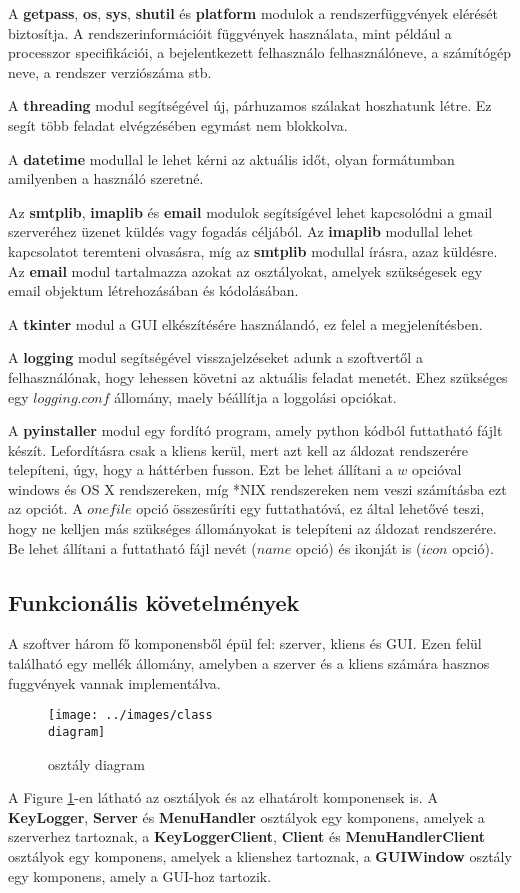 \documentclass[a4paper, 11pt]{article}
\begin{document}
A \textbf{getpass}, \textbf{os}, \textbf{sys}, \textbf{shutil} és \textbf{platform} modulok a rendszerfüggvények elérését biztosítja. A rendszerinformációit függvények használata, mint például a processzor specifikációi, a bejelentkezett felhasználo felhasználóneve, a számítógép neve, a rendszer verziószáma stb.

A \textbf{threading} modul segítségével új, párhuzamos szálakat hoszhatunk létre. Ez segít több feladat elvégzésében egymást nem blokkolva.

A \textbf{datetime} modullal le lehet kérni az aktuális időt, olyan formátumban amilyenben a használó szeretné. %

Az \textbf{smtplib}, \textbf{imaplib} és \textbf{email} modulok segítsígével lehet kapcsolódni a gmail szerveréhez üzenet küldés vagy fogadás céljából. Az \textbf{imaplib} modullal lehet kapcsolatot teremteni olvasásra, míg az \textbf{smtplib} modullal írásra, azaz küldésre. Az \textbf{email} modul tartalmazza azokat az osztályokat, amelyek szükségesek egy email objektum létrehozásában és kódolásában.

A \textbf{tkinter} modul a GUI elkészítésére használandó, ez felel a megjelenítésben.

A \textbf{logging} modul segítségével visszajelzéseket adunk a szoftvertől a felhasználónak, hogy lehessen követni az aktuális feladat menetét. Ehez szükséges egy $logging.conf$ állomány, maely béállítja a loggolási opciókat.

A \textbf{pyinstaller} modul egy fordító program, amely python kódból futtatható fájlt készít. Lefordításra csak a kliens kerül, mert azt kell az áldozat rendszerére telepíteni, úgy, hogy a háttérben fusson. Ezt be lehet állítani a $w$ opcióval windows és OS X rendszereken, míg *NIX rendszereken nem veszi számításba ezt az opciót. A $onefile$ opció összesűríti egy futtathatóvá, ez által lehetővé teszi, hogy ne kelljen más szükséges állományokat is telepíteni az áldozat rendszerére. Be lehet állítani a futtatható fájl nevét ($name$ opció) és ikonját is ($icon$ opció).



\subsection{Funkcionális követelmények}
A szoftver három fő komponensből épül fel: szerver, kliens és GUI. Ezen felül található egy mellék állomány, amelyben a szerver és a kliens számára hasznos fuggvények vannak implementálva.
\begin{figure}[H]
\centering
\texttt{[image: ../images/class\\ diagram]}
\caption{osztály diagram}
\label{fig:classdia}
\end{figure}
A Figure \ref{fig:classdia}-en látható az osztályok és az elhatárolt komponensek is. A \textbf{KeyLogger}, \textbf{Server} és \textbf{MenuHandler} osztályok egy komponens, amelyek a szerverhez tartoznak, a \textbf{KeyLoggerClient}, \textbf{Client} és \textbf{MenuHandlerClient} osztályok egy komponens, amelyek a klienshez tartoznak, a \textbf{GUIWindow} osztály egy komponens, amely a GUI-hoz tartozik.
\end{document}
